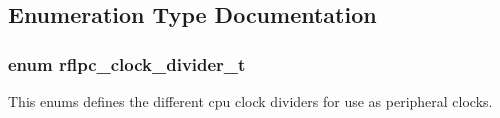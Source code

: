 \subsection{Enumeration Type Documentation}
\hypertarget{group__clock_gaf3b7fc561cd12dfdff9f7c1357c3f016}{
\subsubsection[{rflpc\-\_\-clock\-\_\-divider\-\_\-t}]{\setlength{\rightskip}{0pt plus 5cm}enum {\bf rflpc\-\_\-clock\-\_\-divider\-\_\-t}}}\label{group__clock_gaf3b7fc561cd12dfdff9f7c1357c3f016}


This enums defines the different cpu clock dividers for use as peripheral clocks. 

